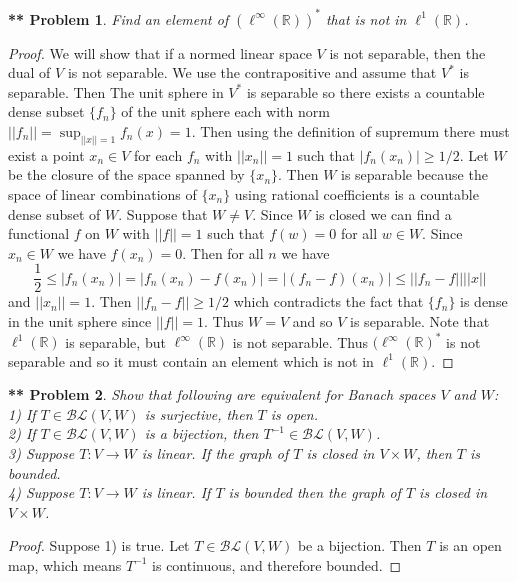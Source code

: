 \documentclass{article}
\newtheorem{**}{** Problem}
\begin{document}
\begin{flushleft}
\begin{**}
Find an element of $(\ell^{\infty} (\mathbb{R}))^*$ that is not in $\ell^1 (\mathbb{R})$.
\end{**}
\begin{proof}
We will show that if a normed linear space $V$ is not separable, then the dual of $V$ is not separable. We use the contrapositive and assume that $V^*$ is separable. Then The unit sphere in $V^*$ is separable so there exists a countable dense subset $\{f_n\}$ of the unit sphere each with norm $||f_n|| = \sup_{||x|| = 1} f_n(x) = 1$. Then using the definition of supremum there must exist a point $x_n \in V$ for each $f_n$ with $||x_n|| = 1$ such that $|f_n(x_n)| \geq 1/2$. Let $W$ be the closure of the space spanned by $\{x_n\}$. Then $W$ is separable because the space of linear combinations of $\{x_n\}$ using rational coefficients is a countable dense subset of $W$. Suppose that $W \neq V$. Since $W$ is closed we can find a functional $f$ on $W$ with $||f|| = 1$ such that $f(w) = 0$ for all $w \in W$. Since $x_n \in W$ we have $f(x_n) = 0$. Then for all $n$ we have
\[
\frac{1}{2} \leq |f_n(x_n)| = |f_n(x_n) - f(x_n)| = |(f_n - f) (x_n)| \leq ||f_n - f||||x||
\]
and $||x_n|| = 1$. Then $||f_n - f|| \geq 1/2$ which contradicts the fact that $\{f_n\}$ is dense in the unit sphere since $||f|| = 1$. Thus $W = V$ and so $V$ is separable. Note that $\ell^1 (\mathbb{R})$ is separable, but $\ell^{\infty} (\mathbb{R})$ is not separable. Thus $(\ell^{\infty} (\mathbb{R})^*$ is not separable and so it must contain an element which is not in $\ell^1 (\mathbb{R})$.
\end{proof}

\begin{**}
Show that following are equivalent for Banach spaces $V$ and $W$:\\
1) If $T \in \mathcal{BL} (V, W)$ is surjective, then $T$ is open.\\
2) If $T \in \mathcal{BL} (V, W)$ is a bijection, then $T^{-1} \in \mathcal{BL} (V, W)$.\\
3) Suppose $T : V \rightarrow W$ is linear. If the graph of $T$ is closed in $V \times W$, then $T$ is bounded.\\
4) Suppose $T : V \rightarrow W$ is linear. If $T$ is bounded then the graph of $T$ is closed in $V \times W$.
\end{**}
\begin{proof}
Suppose 1) is true. Let $T \in \mathcal{BL} (V, W)$ be a bijection. Then $T$ is an open map, which means $T^{-1}$ is continuous, and therefore bounded.\newline


\end{proof}
\end{flushleft}
\end{document}
